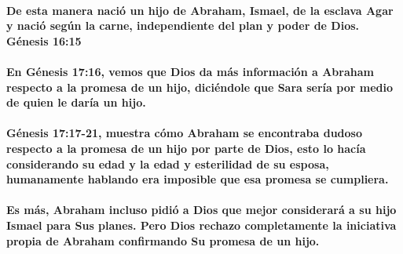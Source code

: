 \documentclass[11a pt,twoside]{article}
\let\oldparagraph\paragraph
\renewcommand{\paragraph}{\needspace{3\baselineskip}\oldparagraph}
\begin{document}
\paragraph{De esta manera nació un hijo de Abraham, Ismael, de la
esclava Agar y nació según la carne, independiente del plan y poder de
Dios. Génesis
16:15}\label{de-esta-manera-naciuxf3-un-hijo-de-abraham-ismael-de-la-esclava-agar-y-naciuxf3-seguxfan-la-carne-independiente-del-plan-y-poder-de-dios.-guxe9nesis-1615}

\paragraph{En Génesis 17:16, vemos que Dios da más información a Abraham
respecto a la promesa de un hijo, diciéndole que Sara sería por medio de
quien le daría un
hijo.}\label{en-guxe9nesis-1716-vemos-que-dios-da-muxe1s-informaciuxf3n-a-abraham-respecto-a-la-promesa-de-un-hijo-diciuxe9ndole-que-sara-seruxeda-por-medio-de-quien-le-daruxeda-un-hijo.}

\paragraph{Génesis 17:17-21, muestra cómo Abraham se encontraba dudoso
respecto a la promesa de un hijo por parte de Dios, esto lo hacía
considerando su edad y la edad y esterilidad de su esposa, humanamente
hablando era imposible que esa promesa se
cumpliera.}\label{guxe9nesis-1717-21-muestra-cuxf3mo-abraham-se-encontraba-dudoso-respecto-a-la-promesa-de-un-hijo-por-parte-de-dios-esto-lo-hacuxeda-considerando-su-edad-y-la-edad-y-esterilidad-de-su-esposa-humanamente-hablando-era-imposible-que-esa-promesa-se-cumpliera.}

\paragraph{Es más, Abraham incluso pidió a Dios que mejor considerará a
su hijo Ismael para Sus planes. Pero Dios rechazo completamente la
iniciativa propia de Abraham confirmando Su promesa de un
hijo.}\label{es-muxe1s-abraham-incluso-pidiuxf3-a-dios-que-mejor-consideraruxe1-a-su-hijo-ismael-para-sus-planes.-pero-dios-rechazo-completamente-la-iniciativa-propia-de-abraham-confirmando-su-promesa-de-un-hijo.}
\end{document}
